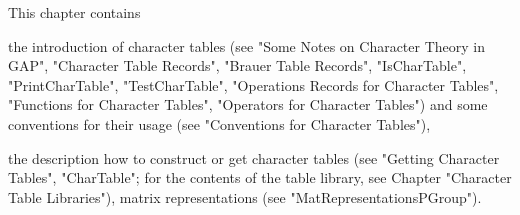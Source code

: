 %

This chapter contains

the introduction of {\GAP} character tables (see "Some Notes on Character
Theory  in  GAP",  "Character Table  Records",  "Brauer  Table  Records",
"IsCharTable",   "PrintCharTable", "TestCharTable",  "Operations  Records
for  Character Tables",  "Functions  for  Character  Tables",  "Operators
for  Character Tables")  and  some  conventions  for   their  usage  (see
"Conventions for Character Tables"),

the  description how to construct or get  character tables  (see "Getting
Character Tables",  "CharTable";  for the contents  of the table library,
see  Chapter "Character  Table Libraries"),  matrix representations  (see
"MatRepresentationsPGroup").

